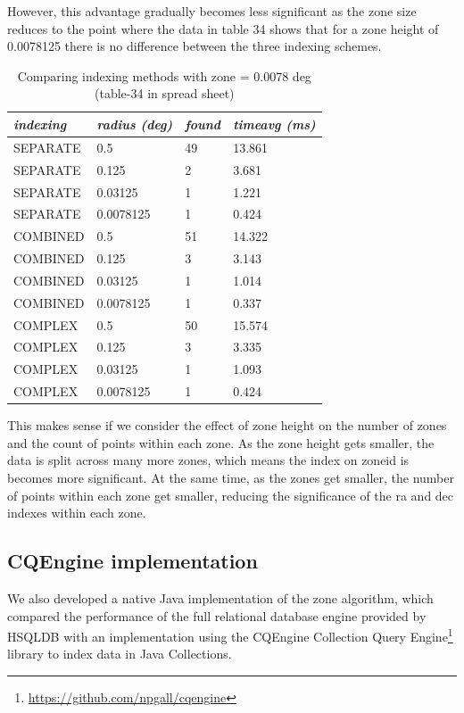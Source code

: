 \documentclass{article}
\newcommand{\hsqldb} {HSQLDB\xspace}
\newcommand{\cqengine} {CQEngine\xspace}
\newcommand{\footurl}[1] {\footnote{\url{#1}}}
\begin{document}
However, this advantage gradually becomes less significant as the zone size reduces to the point where the data in table 34 shows that for a zone height of 0.0078125 there is no difference between the three indexing schemes.

\begin{table}[H]
\centering
\begin{tabular}{|l|l|l|l|}
\hline
\textit{indexing} & \textit{radius (deg)} & \textit{found} & \textit{timeavg (ms)} \\ \hline
SEPARATE & 0.5 & 49 & 13.861 \\ \hline
SEPARATE & 0.125 & 2 & 3.681 \\ \hline
SEPARATE & 0.03125 & 1 & 1.221 \\ \hline
SEPARATE & 0.0078125 & 1 & 0.424 \\ \hline
COMBINED & 0.5 & 51 & 14.322 \\ \hline
COMBINED & 0.125 & 3 & 3.143 \\ \hline
COMBINED & 0.03125 & 1 & 1.014 \\ \hline
COMBINED & 0.0078125 & 1 & 0.337 \\ \hline
COMPLEX & 0.5 & 50 & 15.574 \\ \hline
COMPLEX & 0.125 & 3 & 3.335 \\ \hline
COMPLEX & 0.03125 & 1 & 1.093 \\ \hline
COMPLEX & 0.0078125 & 1 & 0.424 \\ \hline
\end{tabular}
\caption{Comparing indexing methods with zone = 0.0078 deg (table-34 in spread sheet)}
\label{tab:indexing-small-zone}
\end{table}

This makes sense if we consider the effect of zone height on the number of zones and the count of points within each zone.
As the zone height gets smaller, the data is split across many more zones, which means the index on zoneid is becomes more significant. At the same time, as the zones get smaller, the number of points within each zone get smaller, reducing the significance of the ra and dec indexes within each zone.

\subsection{CQEngine implementation}
\label{cqengine-implementation}

We also developed a native Java implementation of the zone algorithm, which compared the performance of the full relational database engine provided by \hsqldb with an implementation using the \cqengine Collection Query Engine\footurl{https://github.com/npgall/cqengine} library to index data in Java Collections.
\end{document}
